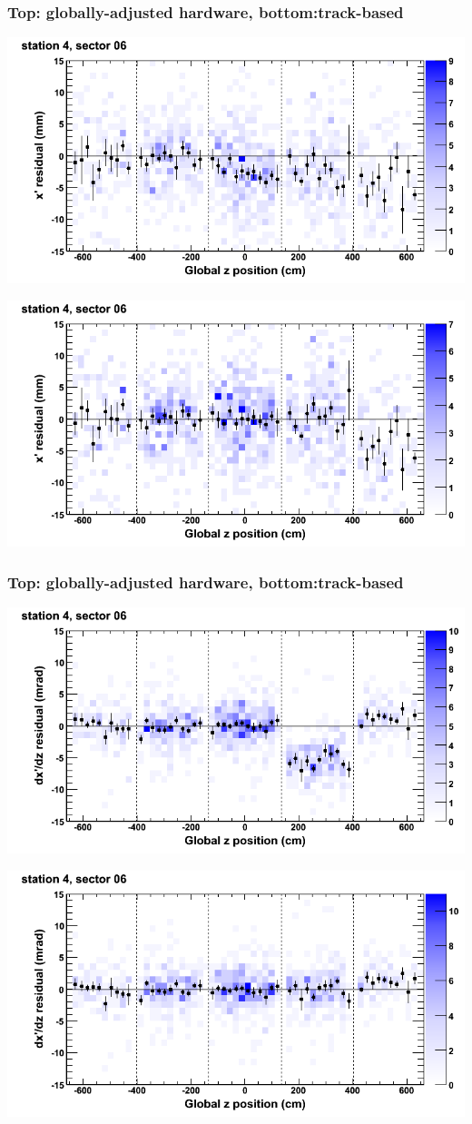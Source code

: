 \documentclass[compress]{beamer}
\begin{document}
\begin{frame}
\frametitle{Top: globally-adjusted hardware, bottom:track-based}
\includegraphics[width=0.7\linewidth]{NOV4_mapplots_HW/DTvsz_st4sec06_x.png}

\includegraphics[width=0.7\linewidth]{NOV4_mapplots/DTvsz_st4sec06_x.png}
\end{frame}

\begin{frame}
\frametitle{Top: globally-adjusted hardware, bottom:track-based}
\includegraphics[width=0.7\linewidth]{NOV4_mapplots_HW/DTvsz_st4sec06_dxdz.png}

\includegraphics[width=0.7\linewidth]{NOV4_mapplots/DTvsz_st4sec06_dxdz.png}
\end{frame}
\end{document}
